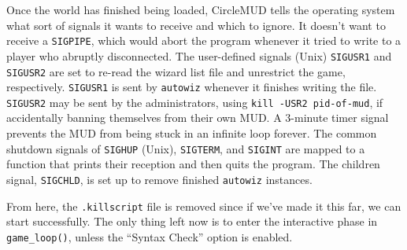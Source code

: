 \documentclass[11pt]{article}
\begin{document}
\par
Once the world has finished being loaded, CircleMUD tells the operating system what sort of signals it wants to receive and which to ignore.  It doesn't want to receive a \texttt{SIGPIPE}, which would abort the program whenever it tried to write to a player who abruptly disconnected. The user-defined signals (Unix) \texttt{SIGUSR1} and \texttt{SIGUSR2} are set to re-read the wizard list file and unrestrict the game, respectively.  \texttt{SIGUSR1} is sent by \texttt{autowiz} whenever it finishes writing the file.  \texttt{SIGUSR2} may be sent by the administrators, using \texttt{kill -USR2 pid-of-mud}, if accidentally banning themselves from their own MUD.  A 3-minute timer signal prevents the MUD from being stuck in an infinite loop forever.  The common shutdown signals of \texttt{SIGHUP} (Unix), \texttt{SIGTERM}, and \texttt{SIGINT} are mapped to a function that prints
their reception and then quits the program.  The children signal, \texttt{SIGCHLD},
is set up to remove finished \texttt{autowiz} instances.
\par
From here, the \texttt{.killscript} file is removed since if we've made it this far, we can start successfully.  The only thing left now is to enter the interactive phase in \texttt{game\_loop()}, unless the ``Syntax Check'' option is enabled.
\end{document}
